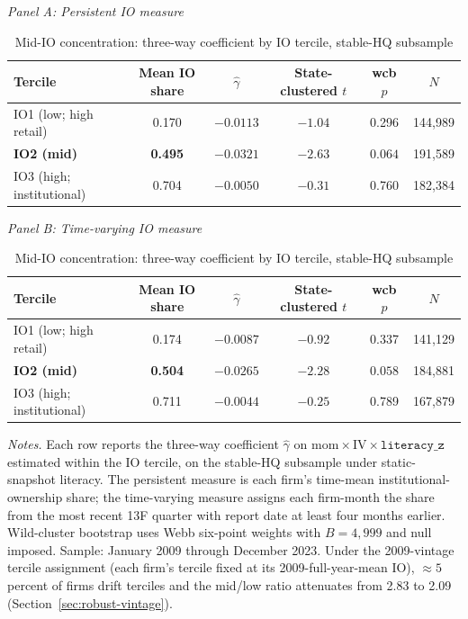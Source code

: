 \begin{table}[t]
\centering
\caption{Mid-IO concentration: three-way coefficient by IO tercile, stable-HQ subsample}
\label{tab:headline}
\footnotesize
\begin{minipage}{\textwidth}
\centering
\textit{Panel A: Persistent IO measure}\\[2pt]
\begin{tabular}{lccccc}
\toprule
Tercile & Mean IO share & $\hat\gamma$ & State-clustered $t$ & wcb $p$ & $N$ \\
\midrule
IO1 (low; high retail)        & 0.170 & $-0.0113$ & $-1.04$ & 0.296 & 144,989 \\
\textbf{IO2 (mid)}            & \textbf{0.495} & $\mathbf{-0.0321}$ & $\mathbf{-2.63}$ & $\mathbf{0.064}$ & 191,589 \\
IO3 (high; institutional)     & 0.704 & $-0.0050$ & $-0.31$ & 0.760 & 182,384 \\
\bottomrule
\end{tabular}

\medskip
\textit{Panel B: Time-varying IO measure}\\[2pt]
\begin{tabular}{lccccc}
\toprule
Tercile & Mean IO share & $\hat\gamma$ & State-clustered $t$ & wcb $p$ & $N$ \\
\midrule
IO1 (low; high retail)        & 0.174 & $-0.0087$ & $-0.92$ & 0.337 & 141,129 \\
\textbf{IO2 (mid)}            & \textbf{0.504} & $\mathbf{-0.0265}$ & $\mathbf{-2.28}$ & $\mathbf{0.058}$ & 184,881 \\
IO3 (high; institutional)     & 0.711 & $-0.0044$ & $-0.25$ & 0.789 & 167,879 \\
\bottomrule
\end{tabular}
\end{minipage}

\medskip
{\footnotesize\textit{Notes.} Each row reports the three-way coefficient $\hat\gamma$ on $\mathrm{mom}\times\mathrm{IV}\times\mathtt{literacy\_z}$ estimated within the IO tercile, on the stable-HQ subsample under static-snapshot literacy. The persistent measure is each firm's time-mean institutional-ownership share; the time-varying measure assigns each firm-month the share from the most recent 13F quarter with report date at least four months earlier. Wild-cluster bootstrap uses Webb six-point weights \citep{cameronGelbachMiller2008} with $B = 4{,}999$ and null imposed. Sample: January 2009 through December 2023. Under the 2009-vintage tercile assignment (each firm's tercile fixed at its 2009-full-year-mean IO), $\approx 5$ percent of firms drift terciles and the mid/low ratio attenuates from 2.83 to 2.09 (Section~\ref{sec:robust-vintage}).}
\end{table}

